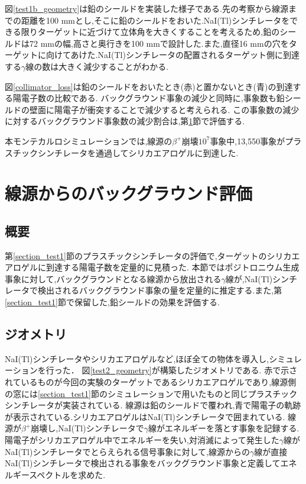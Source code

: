 図\ref{test1b_geometry}は鉛のシールドを実装した様子である.先の考察から線源までの距離を100 mmとし,そこに鉛のシールドをおいた.NaI(Tl)シンチレータをできる限りターゲットに近づけて立体角を大きくすることを考えるため,鉛のシールドは72 mmの幅,高さと奥行きを100 mmで設計した.また,直径16 mmの穴をターゲットに向けてあけた.NaI(Tl)シンチレータの配置されるターゲット側に到達する$\gamma$線の数は大きく減少することがわかる.

図\ref{collimator_loss}は鉛のシールドをおいたとき(赤)と置かないとき(青)の到達する陽電子数の比較である.
バックグラウンド事象の減少と同時に,事象数も鉛シールドの壁面に陽電子が衝突することで減少すると考えられる.
この事象数の減少に対するバックグラウンド事象数の減少割合は,第\ref{section_test2}節で評価する.

本モンテカルロシミュレーションでは,線源の$\beta^+$崩壊$10^7$事象中,13,550事象がプラスチックシンチレータを通過してシリカエアロゲルに到達した.



\section{線源からのバックグラウンド評価}
\label{section_test2}

\subsection{概要}
第\ref{section_test1}節のプラスチックシンチレータの評価で,ターゲットのシリカエアロゲルに到達する陽電子数を定量的に見積った.
本節ではポジトロニウム生成事象に対して,バックグラウンドとなる線源から放出される$\gamma$線が,NaI(Tl)シンチレータで検出されるバックグラウンド事象の量を定量的に推定する.また,第\ref{section_test1}節で保留した,鉛シールドの効果を評価する.


\subsection{ジオメトリ}
NaI(Tl)シンチレータやシリカエアロゲルなど,ほぼ全ての物体を導入し,シミュレーションを行った．
図\ref{test2_geometry}が構築したジオメトリである.
赤で示されているものが今回の実験のターゲットであるシリカエアロゲルであり,線源側の窓には\ref{section_test1}節のシミュレーションで用いたものと同じプラスチックシンチレータが実装されている.
線源は鉛のシールドで覆われ,青で陽電子の軌跡が表示されている.シリカエアロゲルはNaI(Tl)シンチレータで囲まれている.
線源が$\beta^+$崩壊し,NaI(Tl)シンチレータで$\gamma$線がエネルギーを落とす事象を記録する.陽電子がシリカエアロゲル中でエネルギーを失い,対消滅によって発生した$\gamma$線がNaI(Tl)シンチレータでとらえられる信号事象に対して,線源からの$\gamma$線が直接NaI(Tl)シンチレータで検出される事象をバックグラウンド事象と定義してエネルギースペクトルを求めた.

